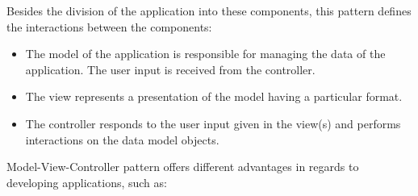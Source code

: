 \documentclass[12pt,a4paper,twoside]{report}
\begin{document}
Besides the division of the application into these components, this pattern defines the interactions between the components:

\begin{itemize}
	\item The model of the application is responsible for managing the data of the application. The user input is received from the controller.
	\item The view represents a presentation of the model having a particular format.
	\item The controller responds to the user input given in the view(s) and performs interactions on the data model objects.
\end{itemize}

Model-View-Controller pattern offers different advantages in regards to developing applications, such as:
\end{document}
